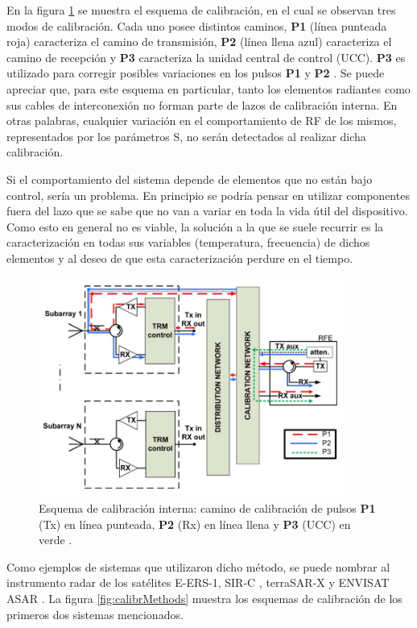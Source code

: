 En la figura \ref{fig:classic_cal_scheme} se muestra el esquema de calibración, en el cual se observan tres modos de
calibración. Cada uno posee distintos caminos, \textbf{P1} (línea punteada roja) caracteriza el camino de transmisión,
\textbf{P2} (línea llena azul) caracteriza el camino de recepción y \textbf{P3} caracteriza la unidad central de control (UCC).
\textbf{P3} es utilizado para corregir posibles variaciones en los pulsos \textbf{P1} y \textbf{P2} \cite{Makhoul2012}. Se puede
apreciar que, para este esquema en particular, tanto los elementos radiantes como sus cables de interconexión no forman parte de
lazos de calibración interna. En otras palabras, cualquier variación en el comportamiento de RF de los mismos, representados
por los parámetros S, no serán detectados al realizar dicha calibración.

Si el comportamiento del sistema depende de elementos que no están bajo control, sería un problema. En principio se podría
pensar en utilizar componentes fuera del lazo que se sabe que no van a variar en toda la vida útil del dispositivo. Como esto en
general no es viable, la solución a la que se suele recurrir es la caracterización en todas sus variables (temperatura,
frecuencia) de dichos elementos y al deseo de que esta caracterización perdure en el tiempo.

\begin{figure}[H]
 \centering
 \includegraphics[width=10cm]{gfx/classic_cal_scheme.png}
 \caption{Esquema de calibración interna: camino de calibración de pulsos \textbf{P1} (Tx) en línea punteada, \textbf{P2} (Rx)
 en línea llena y \textbf{P3} (UCC) en verde \cite{Makhoul2012}.}
 \label{fig:classic_cal_scheme}
\end{figure}

Como ejemplos de sistemas que utilizaron dicho método, se puede nombrar al instrumento radar de los satélites E-ERS-1, SIR-C
\cite{Curlander1991}, terraSAR-X \cite{Schwerdt2005} y ENVISAT ASAR \cite{Loop}. La figura \ref{fig:calibrMethods} muestra los esquemas
de calibración de los primeros dos sistemas mencionados.

